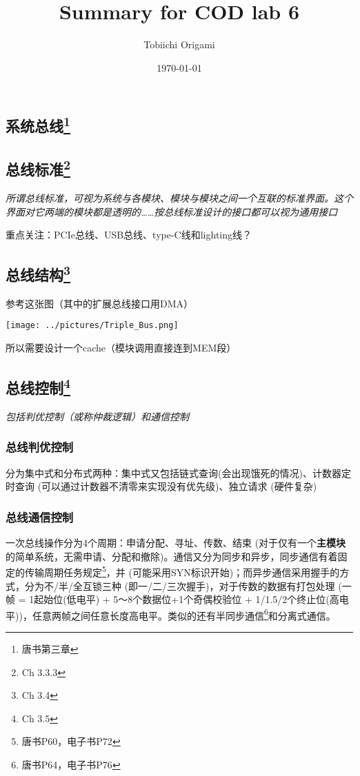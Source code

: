 \documentclass[]{report}
\title{Summary for COD lab 6}
\author{Tobiichi Origami}
\date{\today}
\begin{document}
	\maketitle


	\begin{center}
		\chapter[]{系统总线\footnote{唐书第三章}}
	\end{center}
		\section[]{总线标准\footnote{Ch 3.3.3}}\par
			\emph{所谓总线标准，可视为系统与各模块、模块与模块之间一个互联的标准界面。这个界面对它两端的模块都是透明的……按总线标准设计的接口都可以视为通用接口}\par
			重点关注：PCIe总线、USB总线、type-C线和lighting线？
		\section[]{总线结构\footnote{Ch 3.4}}\par
			参考这张图（其中的扩展总线接口用DMA）\par
			\texttt{[image: ../pictures/Triple\_Bus.png]}\par
			所以需要设计一个cache（模块调用直接连到MEM段）
		\section[]{总线控制\footnote{Ch 3.5}}\par
			\emph{包括判优控制（或称仲裁逻辑）和通信控制}
			\subsection{总线判优控制}\par
				分为集中式和分布式两种：集中式又包括链式查询(会出现饿死的情况)、计数器定时查询 (可以通过计数器不清零来实现没有优先级)、独立请求 (硬件复杂)
			\subsection{总线通信控制}\par
				一次总线操作分为4个周期：申请分配、寻址、传数、结束 (对于仅有一个\textbf{主模块}的简单系统，无需申请、分配和撤除)。通信又分为同步和异步，同步通信有着固定的传输周期任务规定\footnote{唐书P60，电子书P72}，并 (可能采用SYN标识开始)；而异步通信采用握手的方式，分为不/半/全互锁三种 (即一/二/三次握手)，对于传数的数据有打包处理 (一帧 = 1起始位(低电平) + 5～8个数据位+1个奇偶校验位 + 1/1.5/2个终止位(高电平))，任意两帧之间任意长度高电平。类似的还有半同步通信\footnote{唐书P64，电子书P76}和分离式通信。
\end{document}
